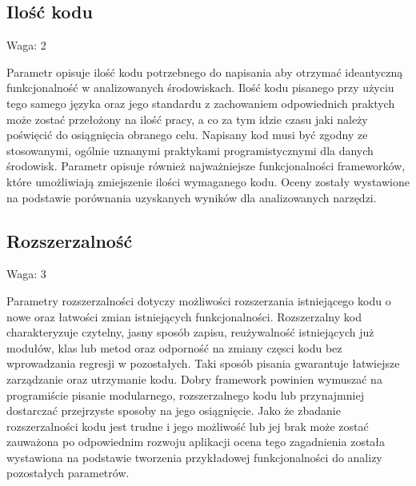 \documentclass[12pt]{report}
\begin{document}
    \subsection{Ilość kodu}
      \begin{description}
        \item Waga: 2
      \end{description}
      Parametr opisuje ilość kodu potrzebnego do napisania aby otrzymać ideantyczną funkcjonalność w analizowanych środowiskach.
      Ilość kodu pisanego przy użyciu tego samego języka oraz jego standardu z zachowaniem odpowiednich praktych może zostać przełożony na ilość pracy, a co za tym idzie czasu jaki należy poświęcić do osiągnięcia obranego celu.
      Napisany kod musi być zgodny ze stosowanymi, ogólnie uznanymi praktykami programistycznymi dla danych środowisk.
      Parametr opisuje również najważniejsze funkcjonalności frameworków, które umożliwiają zmiejszenie ilości wymaganego kodu.
      Oceny zostały wystawione na podstawie porównania uzyskanych wyników dla analizowanych narzędzi.

    \subsection{Rozszerzalność}
      \begin{description}
        \item Waga: 3
      \end{description}
      Parametry rozszerzalności dotyczy możliwości rozszerzania istniejącego kodu o nowe oraz łatwości zmian istniejących funkcjonalności.
      Rozszerzalny kod charakteryzuje czytelny, jasny sposób zapisu, reużywalność istniejących już modułów, klas lub metod oraz odporność na zmiany częsci kodu bez wprowadzania regresji w pozostałych.
      Taki sposób pisania gwarantuje łatwiejsze zarządzanie oraz utrzymanie kodu.
      Dobry framework powinien wymuszać na programiście pisanie modularnego, rozszerzalnego kodu lub przynajmniej dostarczać przejrzyste sposoby na jego osiągnięcie.
      Jako że zbadanie rozszerzalności kodu jest trudne i jego możliwość lub jej brak może zostać zauważona po odpowiednim rozwoju aplikacji ocena tego zagadnienia została wystawiona na podstawie tworzenia przykładowej funkcjonalności do analizy pozostałych parametrów.
\end{document}
